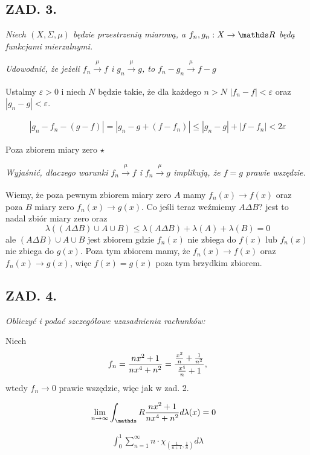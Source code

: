 \documentclass{article}
\begin{document}
\subsection*{ZAD. 3.}
\emph{Niech $(X,\Sigma,\mu)$ będzie przestrzenią miarową, a $f_n,g_n:X\to\R$ będą funkcjami mierzalnymi.}
\medskip

\emph{\color{def}Udowodnić, że jeżeli $f_n\xrightarrow[]{\mu}f$ i $g_n\xrightarrow[]{\mu}g$, to $f_n - g_n\xrightarrow[]{\mu}f - g$}
\medskip

Ustalmy $\varepsilon>0$ i niech $N$ będzie takie, że dla każdego $n>N$ $|f_n-f| < \varepsilon$ oraz $|g_n-g|<\varepsilon$.

\begin{align*}
    |g_n-f_n-(g-f)|=|g_n-g+(f-f_n)|\leq|g_n-g|+|f-f_n|<2\varepsilon
\end{align*}

Poza zbiorem miary zero $\star$
\medskip

\emph{\color{def}Wyjaśnić, dlaczego warunki $f_n\xrightarrow[]{\mu}f$ i $f_n\xrightarrow[]{\mu}g$ implikują, że $f=g$ prawie wszędzie.}
\medskip

Wiemy, że poza pewnym zbiorem miary zero $A$ mamy $f_n(x)\to f(x)$ oraz poza $B$ miary zero $f_n(x)\to g(x)$. Co jeśli teraz weźmiemy $A\Delta B$? jest to nadal zbiór miary zero oraz
$$\lambda((A\Delta B)\cup A\cup B)\leq\lambda(A\Delta B)+\lambda(A)+\lambda(B)=0$$
ale $(A\Delta B)\cup A\cup B$ jest zbiorem gdzie $f_n(x)$ nie zbiega do $f(x)$ lub $f_n(x)$ nie zbiega do $g(x)$. Poza tym zbiorem mamy, że $f_n(x)\to f(x)$ oraz $f_n(x)\to g(x)$, więc $f(x)=g(x)$ poza tym brzydkim zbiorem.

\subsection*{ZAD. 4.}
\emph{Obliczyć i podać szczegółowe uzasadnienia rachunków:}
\medskip

Niech 
$$f_n={nx^2+1\over nx^4+n^2}={{x^2\over n}+\frac1{n^2}\over{x^4\over n}+1},$$ 
wtedy $f_n\to0$ prawie wszędzie, więc jak w zad. 2.

\begin{align*}
    \lim_{n\to\infty}\int_\R{nx^2+1\over nx^4+n^2}d\lambda(x)&=0
\end{align*}

\begin{align*}
    \int_0^1\sum_{n=1}^\infty n\cdot\chi_{(\frac1{n+1}, \frac 1n)}d\lambda
\end{align*}
\end{document}

